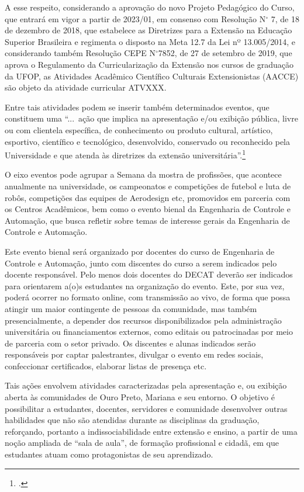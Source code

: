 \documentclass[
	12pt,				%
	openright,			%
	oneside,			%
	a4paper,			%
	english,			%
	brazil				%
	]{abntex2}
\begin{document}
A esse respeito, considerando a aprovação do novo Projeto Pedagógico do Curso, que entrará em vigor a partir de 2023/01, em consenso com Resolução N$^\circ$ 7, de 18 de dezembro de 2018, que estabelece as Diretrizes para a Extensão na Educação Superior Brasileira e regimenta o disposto na Meta 12.7 da Lei nº 13.005/2014, e considerando também Resolução CEPE N$^\circ$7852, de 27 de setembro de 2019, que aprova o Regulamento da Curricularização da Extensão nos cursos de graduação da UFOP, as Atividades Acadêmico Científico Culturais Extensionistas (AACCE) são objeto da atividade curricular ATVXXX.

Entre tais atividades podem se inserir também determinados eventos, que constituem uma ``...~ação que implica na apresentação e/ou exibição pública, livre ou com clientela específica, de conhecimento ou produto cultural, artístico, esportivo, científico e tecnológico, desenvolvido, conservado ou reconhecido pela Universidade e que atenda às diretrizes da extensão universitária''.\footcite{manual-ppc-ufop}

O eixo eventos pode agrupar a Semana da mostra de profissões, que acontece anualmente na universidade, os campeonatos e competições de futebol e luta de robôs, competições das equipes de Aerodesign etc, promovidos em parceria com os Centros Acadêmicos, bem como o evento bienal da Engenharia de Controle e Automação, que busca refletir sobre temas de interesse gerais da Engenharia de Controle e Automação.

Este evento bienal será organizado por docentes do curso de Engenharia de Controle e Automação, junto com discentes do curso a serem indicados pelo docente responsável. Pelo menos dois docentes do DECAT deverão ser indicados para orientarem a(o)s estudantes na organização do evento. Este, por sua vez, poderá ocorrer no formato online, com transmissão ao vivo, de forma que possa atingir um  maior contingente de pessoas da comunidade, mas também presencialmente, a depender dos recursos disponibilizados pela administração universitária ou financiamentos externos, como editais ou patrocinadas por meio de parceria com o setor privado. Os discentes e alunas indicados serão responsáveis por captar palestrantes, divulgar o evento em redes sociais, confeccionar certificados, elaborar listas de presença etc.

Tais ações envolvem atividades caracterizadas pela apresentação e, ou exibição aberta às comunidades de Ouro Preto, Mariana e seu entorno. O objetivo é possibilitar a estudantes, docentes, servidores e comunidade desenvolver outras habilidades que não são atendidas durante as disciplinas da graduação, reforçando, portanto a indissociabilidade entre extensão e ensino, a partir de uma noção ampliada de ``sala de aula'', de formação profissional e cidadã, em que estudantes atuam como protagonistas de seu aprendizado.
\end{document}
